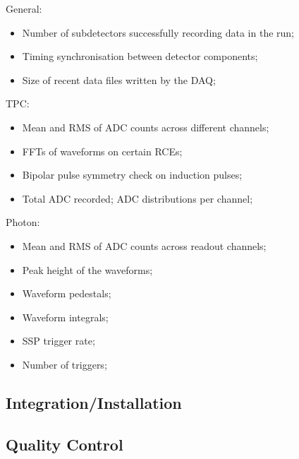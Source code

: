 General:
\begin{itemize}
\item{Number of subdetectors successfully recording data in the run;}
\item{Timing synchronisation between detector components;}
\item{Size of recent data files written by the DAQ;}
\end{itemize}
  TPC:
\begin{itemize}
\item{Mean and RMS of ADC counts across different channels;}
\item{FFTs of waveforms on certain RCEs;}
\item{Bipolar pulse symmetry check on induction pulses;}
\item{Total ADC recorded; ADC distributions per channel;}
\end{itemize}
Photon:
\begin{itemize}
\item{Mean and RMS of ADC counts across readout channels;}
\item{Peak height of the waveforms;}
\item{Waveform pedestals;}
\item{Waveform integrals;}
\item{SSP trigger rate;}
\item{Number of triggers;}
\end{itemize}





\subsection{Integration/Installation}


\subsection{Quality Control}


